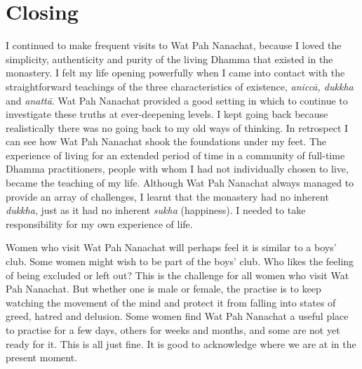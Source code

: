 \section{Closing}

I continued to make frequent visits to Wat Pah Nanachat, because I loved
the simplicity, authenticity and purity of the living Dhamma that
existed in the monastery. I felt my life opening powerfully when I came
into contact with the straightforward teachings of the three
characteristics of existence, \emph{aniccā, dukkha} and \emph{anattā}. 
Wat Pah Nanachat provided a good setting in which to continue to
investigate these truths at ever-deepening levels. I kept going back
because realistically there was no going back to my old ways of
thinking. In retrospect I can see how Wat Pah Nanachat shook the
foundations under my feet. The experience of living for an extended
period of time in a community of full-time Dhamma practitioners, people
with whom I had not individually chosen to live, became the teaching of
my life. Although Wat Pah Nanachat always managed to provide an array of
challenges, I learnt that the monastery had no inherent \emph{dukkha}, 
just as it had no inherent \emph{sukha} (happiness). I needed to take
responsibility for my own experience of life. 

Women who visit Wat Pah Nanachat will perhaps feel it is similar to a
boys' club. Some women might wish to be part of the boys' club. Who
likes the feeling of being excluded or left out? This is the challenge
for all women who visit Wat Pah Nanachat. But whether one is male or
female, the practise is to keep watching the movement of the mind and
protect it from falling into states of greed, hatred and delusion. Some
women find Wat Pah Nanachat a useful place to practise for a few days, 
others for weeks and months, and some are not yet ready for it. This is
all just fine. It is good to acknowledge where we are at in the present
moment. 

